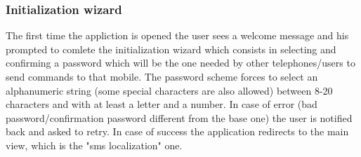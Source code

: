 \subsubsection{Initialization wizard}
The first time the appliction is opened the user sees a welcome message and his prompted to comlete the initialization wizard which consists in selecting and confirming a password which will be the one needed by other telephones/users to send commands to that mobile. The password scheme forces to select an alphanumeric string (some special characters are also allowed) between 8-20 characters and with at least a letter and a number. In case of error (bad password/confirmation password different from the base one) the user is notified back and asked to retry. In case of success the application redirects to the main view, which is the "sms localization" one.